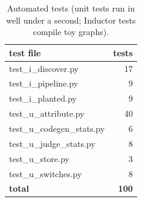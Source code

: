 \begin{table}[h]\centering\small
\begin{tabular}{lr}\toprule
test file & tests \\\midrule
test\_i\_discover.py & 17 \\
test\_i\_pipeline.py & 9 \\
test\_i\_planted.py & 9 \\
test\_u\_attribute.py & 40 \\
test\_u\_codegen\_stats.py & 6 \\
test\_u\_judge\_stats.py & 8 \\
test\_u\_store.py & 3 \\
test\_u\_switches.py & 8 \\
\textbf{total} & \textbf{100} \\
\bottomrule\end{tabular}
\caption{Automated tests (unit tests run in well under a second; Inductor tests compile toy graphs).}\label{tab:tests}
\end{table}%
